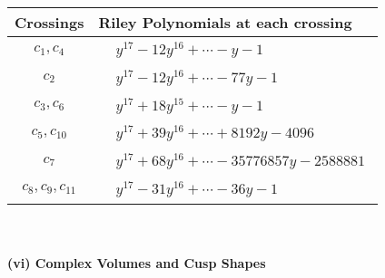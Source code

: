 \documentclass[1p]{elsarticle_modified}
\theoremstyle{definition}
\begin{document}
\begin{tabular}{m{50pt}|m{274pt}}
Crossings & \hspace{64pt}Riley Polynomials at each crossing \\
\hline $$\begin{aligned}c_{1},c_{4}\end{aligned}$$&$\begin{aligned}
&y^{17}-12 y^{16}+\cdots- y-1
\end{aligned}$\\
\hline $$\begin{aligned}c_{2}\end{aligned}$$&$\begin{aligned}
&y^{17}-12 y^{16}+\cdots-77 y-1
\end{aligned}$\\
\hline $$\begin{aligned}c_{3},c_{6}\end{aligned}$$&$\begin{aligned}
&y^{17}+18 y^{15}+\cdots- y-1
\end{aligned}$\\
\hline $$\begin{aligned}c_{5},c_{10}\end{aligned}$$&$\begin{aligned}
&y^{17}+39 y^{16}+\cdots+8192 y-4096
\end{aligned}$\\
\hline $$\begin{aligned}c_{7}\end{aligned}$$&$\begin{aligned}
&y^{17}+68 y^{16}+\cdots-35776857 y-2588881
\end{aligned}$\\
\hline $$\begin{aligned}c_{8},c_{9},c_{11}\end{aligned}$$&$\begin{aligned}
&y^{17}-31 y^{16}+\cdots-36 y-1
\end{aligned}$\\
\hline
\end{tabular}\\~\\
\newpage\flushleft \textbf{(vi) Complex Volumes and Cusp Shapes}
\end{document}
